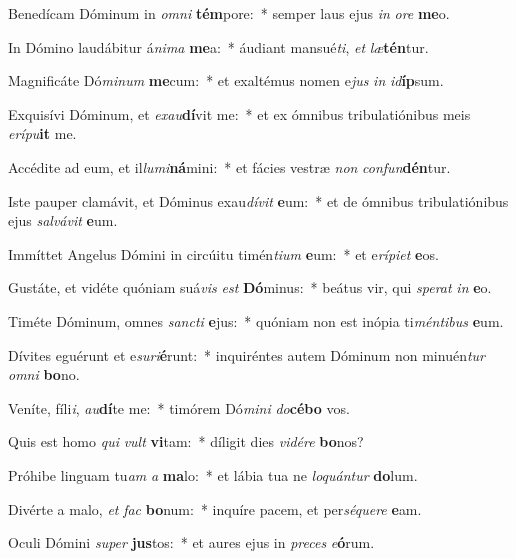 \item Benedícam Dóminum in \textit{om}\textit{ni} \textbf{tém}pore:~* semper laus ejus \textit{in} \textit{o}\textit{re} \textbf{me}o.
\item In Dómino laudábitur á\textit{ni}\textit{ma} \textbf{me}a:~* áudiant mansué\textit{ti}, \textit{et} \textit{læ}\textbf{tén}tur.
\item Magnificáte Dó\textit{mi}\textit{num} \textbf{me}cum:~* et exaltémus nomen e\textit{jus} \textit{in} \textit{id}\textbf{íp}sum.
\item Exquisívi Dóminum, et \textit{ex}\textit{au}\textbf{dí}vit me:~* et ex ómnibus tribulatiónibus meis \textit{e}\textit{rí}\textit{pu}\textbf{it} me.
\item Accédite ad eum, et il\textit{lu}\textit{mi}\textbf{ná}mini:~* et fácies vestræ \textit{non} \textit{con}\textit{fun}\textbf{dén}tur.
\item Iste pauper clamávit, et Dóminus exau\textit{dí}\textit{vit} \textbf{e}um:~* et de ómnibus tribulatiónibus ejus \textit{sal}\textit{vá}\textit{vit} \textbf{e}um.
\item Immíttet Angelus Dómini in circúitu timén\textit{ti}\textit{um} \textbf{e}um:~* et e\textit{rí}\textit{pi}\textit{et} \textbf{e}os.
\item Gustáte, et vidéte quóniam suá\textit{vis} \textit{est} \textbf{Dó}minus:~* beátus vir, qui \textit{spe}\textit{rat} \textit{in} \textbf{e}o.
\item Timéte Dóminum, omnes \textit{sanc}\textit{ti} \textbf{e}jus:~* quóniam non est inópia ti\textit{mén}\textit{ti}\textit{bus} \textbf{e}um.
\item Dívites eguérunt et e\textit{su}\textit{ri}\textbf{é}\-runt:~* inquiréntes autem Dóminum non minuén\textit{tur} \textit{om}\textit{ni} \textbf{bo}no.
\item Veníte, fíli\textit{i}, \textit{au}\textbf{dí}te me:~* timórem Dó\textit{mi}\textit{ni} \textit{do}\textbf{cé}\textbf{bo} vos.
\item Quis est homo \textit{qui} \textit{vult} \textbf{vi}tam:~* díligit dies \textit{vi}\textit{dé}\textit{re} \textbf{bo}nos?
\item Próhibe linguam tu\textit{am} \textit{a} \textbf{ma}lo:~* et lábia tua ne \textit{lo}\textit{quán}\textit{tur} \textbf{do}lum.
\item Divérte a malo, \textit{et} \textit{fac} \textbf{bo}num:~* inquíre pacem, et per\textit{sé}\textit{que}\textit{re} \textbf{e}am.
\item Oculi Dómini \textit{su}\textit{per} \textbf{jus}tos:~* et aures ejus in \textit{pre}\textit{ces} \textit{e}\textbf{ó}rum.
